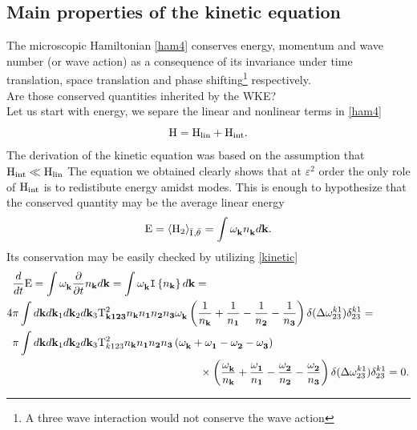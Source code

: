 \subsection{Main properties of the kinetic equation}

The microscopic Hamiltonian \eqref{ham4} conserves energy, momentum and wave number (or wave action) as a consequence of its invariance under time translation,
space translation and phase shifting\footnote{A three wave interaction would not conserve the wave action} respectively. \\
Are those conserved quantities inherited by the WKE?\\
Let us start with energy, we separe the linear and nonlinear terms in \eqref{ham4}
\begin{equation}
    \mathrm{H} = \mathrm{H}_{\text{lin}} + \mathrm{H}_{\text{int}}.
\end{equation}
The derivation of the kinetic equation was based on the assumption that $\mathrm{H}_{\text{int}} \ll \mathrm{H}_{\text{lin}}$ The equation we obtained clearly 
shows that at $\varepsilon^2$ 
order the only role of $\mathrm{H}_{\text{int}}$ is to redistibute energy amidst modes. This is enough to hypothesize that the conserved quantity may be the 
average linear energy
\begin{equation}
    \mathrm{E} = \left\langle \mathrm{H}_2 \right\rangle_{\bar{\mathrm{I}^{}},\bar{\theta}^{}} = \int \omega^{}_{\mathbf{k}} n^{}_\mathbf{k} d\mathbf{k}.
\end{equation}
Its conservation may be easily checked by utilizing \eqref{kinetic} 
\begin{align}
    &\dt \Ewav = \int \omga_{\mathbf{k}} \pt n_\mathbf{k} d\mathbf{k} = \int \omga_{\mathbf{k}} \coll d\mathbf{k} = \label{encons}\\
    4 &\pi\int  d\mathbf{k} d\mathbf{k}_1 d\mathbf{k}_2 d\mathbf{k}_3 
    \Tint^2_\mathbf{k123}n_\mathbf{k}n_\mathbf{1}n_\mathbf{2}n_\mathbf{3} \omga_{\mathbf{k}}
    \left(\frac{1}{n_\mathbf{k}} + \frac{1}{n_\mathbf{1}} - \frac{1}{n_\mathbf{2}}- \frac{1}{n_\mathbf{3}}  \right)
    \delta(\delomega^{k1}_{23})\delta^{k1}_{23} = \\
    &\pi\int  d\mathbf{k} d\mathbf{k}_1 d\mathbf{k}_2 d\mathbf{k}_3 
    \Tint^2_{k123}n_\mathbf{k}n_\mathbf{1}n_\mathbf{2}n_\mathbf{3} \left(\omga_{\mathbf{k}} + \omga_\mathbf{1} - \omga_\mathbf{2} - \omga_\mathbf{3}\right) \\
    & \hspace{6cm}\times\left(\frac{\omga_{\mathbf{k}}}{n_\mathbf{k}} + \frac{\omga_\mathbf{1}}{n_\mathbf{1}} - 
    \frac{\omga_{\mathbf{2}}}{n_\mathbf{2}}- \frac{\omga_{\mathbf{2}}}{n_\mathbf{3}}  \right)
    \delta(\delomega^{k1}_{23})\delta^{k1}_{23} = 0.    
\end{align}
